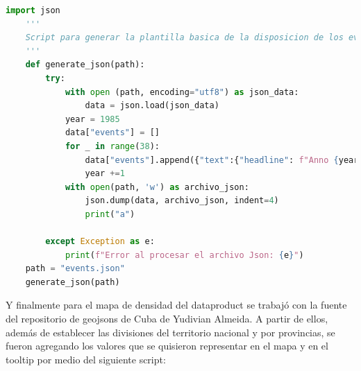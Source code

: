 \documentclass{article}
\begin{document}
\begin{lstlisting}[language=Python, caption=Script para plantilla básica del Json de la historia]
    import json
    '''
    Script para generar la plantilla basica de la disposicion de los eventos de la historia a partir de solamente el title
    '''
    def generate_json(path):
        try:
            with open (path, encoding="utf8") as json_data:
                data = json.load(json_data)
            year = 1985
            data["events"] = []
            for _ in range(38):
                data["events"].append({"text":{"headline": f"Anno {year}.", "text":f"<p>Esto ocurrio en el anno {year}.</p"},"start_date": {"year": year}})
                year +=1
            with open(path, 'w') as archivo_json:
                json.dump(data, archivo_json, indent=4)
                print("a")
    
        except Exception as e:
            print(f"Error al procesar el archivo Json: {e}")
    path = "events.json"
    generate_json(path)

\end{lstlisting}
Y finalmente para el mapa de densidad del dataproduct se trabajó con la fuente del repositorio de geojsons de Cuba de Yudivian Almeida. A partir de ellos, además de establecer 
las divisiones del territorio nacional y por provincias, se fueron agregando los valores que se quisieron representar en el mapa y en el tooltip por medio del siguiente script:
\end{document}
